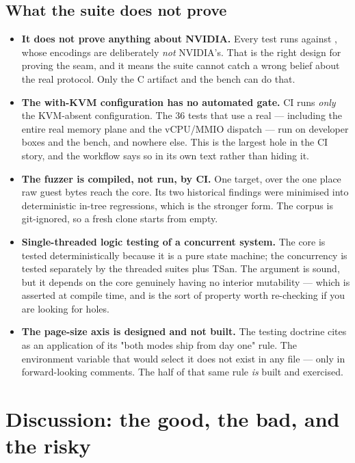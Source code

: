 \documentclass[10.5pt]{article}
\begin{document}
\subsection{What the suite does not prove}

\begin{itemize}
\item \textbf{It does not prove anything about NVIDIA.} Every test runs against
  , whose encodings are deliberately \emph{not} NVIDIA's. That is the right
  design for proving the seam, and it means the suite cannot catch a wrong belief about the real
  protocol. Only the C artifact and the bench can do that.
\item \textbf{The with-KVM configuration has no automated gate.} CI runs \emph{only} the
  KVM-absent configuration. The 36 tests that use a real  — including the entire
  real memory plane and the vCPU/MMIO dispatch — run on developer boxes and the bench, and
  nowhere else. This is the largest hole in the CI story, and the workflow says so in its own
  text rather than hiding it.
\item \textbf{The fuzzer is compiled, not run, by CI.} One target, over the one place raw guest
  bytes reach the core. Its two historical findings were minimised into deterministic in-tree
  regressions, which is the stronger form. The corpus is git-ignored, so a fresh clone starts
  from empty.
\item \textbf{Single-threaded logic testing of a concurrent system.} The core is tested
  deterministically because it is a pure state machine; the concurrency is tested separately by
  the threaded suites plus TSan. The argument is sound, but it depends on the core genuinely
  having no interior mutability — which is asserted at compile time, and is the sort of property
  worth re-checking if you are looking for holes.
\item \textbf{The page-size axis is designed and not built.} The testing doctrine cites
   as an application of its "both modes ship from day one" rule.
  The environment variable that would select it does not exist in any  file — only in
  forward-looking comments. The  half of that same rule \emph{is} built and
  exercised.
\end{itemize}

\section{Discussion: the good, the bad, and the risky}
\label{sec:discussion}
\end{document}
